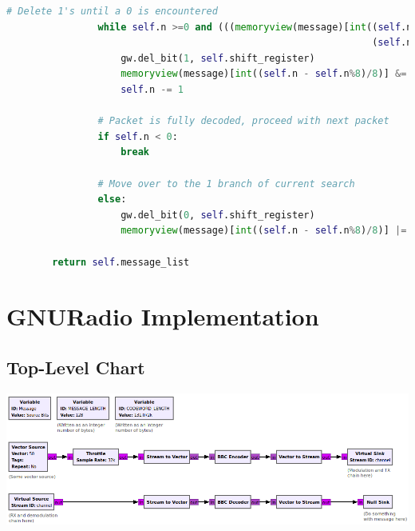 \documentclass[conference]{IEEEtran}
\begin{document}
\begin{lstlisting}[language=Python]
                # Delete 1's until a 0 is encountered
                while self.n >=0 and (((memoryview(message)[int((self.n - self.n%8)/8)]>>\
                                                                (self.n%8)) & 0b1 )==1):
                    gw.del_bit(1, self.shift_register)
                    memoryview(message)[int((self.n - self.n%8)/8)] &= (0xff ^ (1<<self.n%8))
                    self.n -= 1
                    
                # Packet is fully decoded, proceed with next packet
                if self.n < 0: 
                    break
                    
                # Move over to the 1 branch of current search
                else: 
                    gw.del_bit(0, self.shift_register)
                    memoryview(message)[int((self.n - self.n%8)/8)] |= (1<<self.n%8)

        return self.message_list
\end{lstlisting} 

\newpage
\section{GNURadio Implementation}
\subsection{Top-Level Chart}
\label{GnuTopLevel}
    \includegraphics[scale=.6]{images/BBC grc.png}
\end{document}
